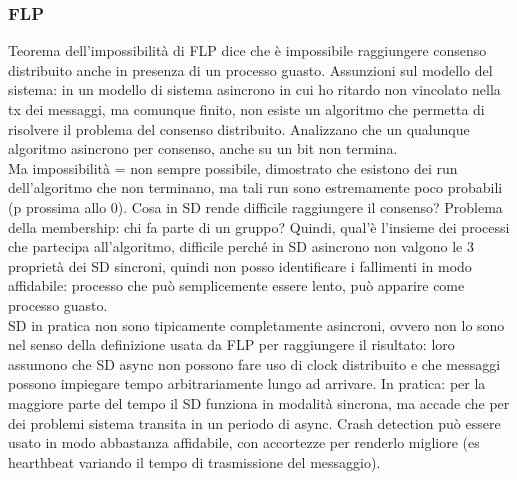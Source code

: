 \documentclass{article}
\begin{document}
\subsubsection{FLP}
Teorema dell'impossibilità di FLP dice che è impossibile raggiungere consenso distribuito anche in presenza di un processo guasto. Assunzioni sul modello del sistema: in un modello di sistema asincrono in cui ho ritardo non vincolato nella tx dei messaggi, ma comunque finito, non esiste un algoritmo che permetta di risolvere il problema del consenso distribuito. Analizzano che un qualunque algoritmo asincrono per consenso, anche su un bit non termina.\\ Ma impossibilità = non sempre possibile, dimostrato che esistono dei run dell'algoritmo che non terminano, ma tali run sono estremamente poco probabili (p prossima allo 0). Cosa in SD rende difficile raggiungere il consenso? Problema della membership:
chi fa parte di un gruppo? Quindi, qual'è l'insieme dei processi che partecipa all'algoritmo, difficile perché in SD asincrono non valgono le 3 proprietà dei SD sincroni, quindi non posso identificare i fallimenti in modo affidabile: processo che può semplicemente essere lento, può apparire come processo guasto.\\ SD in pratica non sono tipicamente completamente asincroni, ovvero non lo sono nel senso della definizione usata da FLP per raggiungere il risultato: loro assumono che SD async non possono fare uso di clock distribuito e che messaggi possono impiegare tempo arbitrariamente lungo ad arrivare. In pratica: per la maggiore parte del tempo il SD funziona in modalità sincrona, ma accade che per dei problemi sistema transita in un periodo di async. Crash detection può essere usato in modo abbastanza affidabile, con accortezze per renderlo migliore (es hearthbeat variando il tempo di trasmissione del messaggio).
\end{document}
